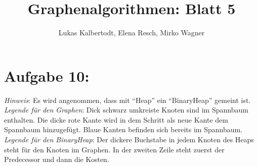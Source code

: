 \documentclass[11pt]{scrartcl} %
\title{Graphenalgorithmen: Blatt 5}
\author{Lukas Kalbertodt, Elena Resch, Mirko Wagner}
\begin{document}
\maketitle


\section*{Aufgabe 10:}
\emph{Hinweis}: Es wird angenommen, dass mit \enquote{Heap} ein \enquote{BinaryHeap} gemeint ist.\\[0.2cm]
\emph{Legende für den Graphen}: Dick schwarz umkreiste Knoten sind im Spannbaum enthalten. Die dicke rote Kante wird in dem Schritt als neue Kante dem Spannbaum hinzugefügt. Blaue Kanten befinden sich bereits im Spannbaum.\\[0.2cm]
\emph{Legende für den BinaryHeap}: Der dickere Buchstabe in jedem Knoten des Heaps steht für den Knoten im Graphen. In der zweiten Zeile steht zuerst der Predecessor und dann die Kosten.
\end{document}
